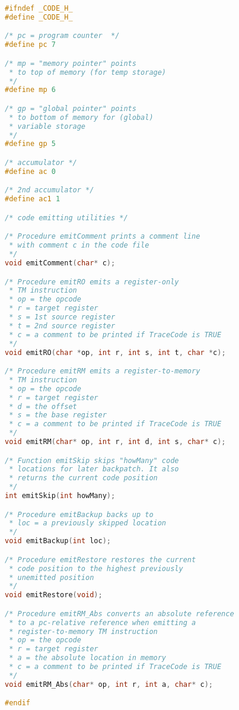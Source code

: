 \documentclass[lang=cn,10pt]{elegantbook}
\begin{document}
\begin{lstlisting}[caption={code.h},language=c]
#ifndef _CODE_H_
#define _CODE_H_

/* pc = program counter  */
#define pc 7

/* mp = "memory pointer" points
 * to top of memory (for temp storage)
 */
#define mp 6

/* gp = "global pointer" points
 * to bottom of memory for (global)
 * variable storage
 */
#define gp 5

/* accumulator */
#define ac 0

/* 2nd accumulator */
#define ac1 1

/* code emitting utilities */

/* Procedure emitComment prints a comment line 
 * with comment c in the code file
 */
void emitComment(char* c);

/* Procedure emitRO emits a register-only
 * TM instruction
 * op = the opcode
 * r = target register
 * s = 1st source register
 * t = 2nd source register
 * c = a comment to be printed if TraceCode is TRUE
 */
void emitRO(char *op, int r, int s, int t, char *c);

/* Procedure emitRM emits a register-to-memory
 * TM instruction
 * op = the opcode
 * r = target register
 * d = the offset
 * s = the base register
 * c = a comment to be printed if TraceCode is TRUE
 */
void emitRM(char* op, int r, int d, int s, char* c);

/* Function emitSkip skips "howMany" code
 * locations for later backpatch. It also
 * returns the current code position
 */
int emitSkip(int howMany);

/* Procedure emitBackup backs up to 
 * loc = a previously skipped location
 */
void emitBackup(int loc);

/* Procedure emitRestore restores the current 
 * code position to the highest previously
 * unemitted position
 */
void emitRestore(void);

/* Procedure emitRM_Abs converts an absolute reference 
 * to a pc-relative reference when emitting a
 * register-to-memory TM instruction
 * op = the opcode
 * r = target register
 * a = the absolute location in memory
 * c = a comment to be printed if TraceCode is TRUE
 */
void emitRM_Abs(char* op, int r, int a, char* c);

#endif
\end{lstlisting}
\end{document}
